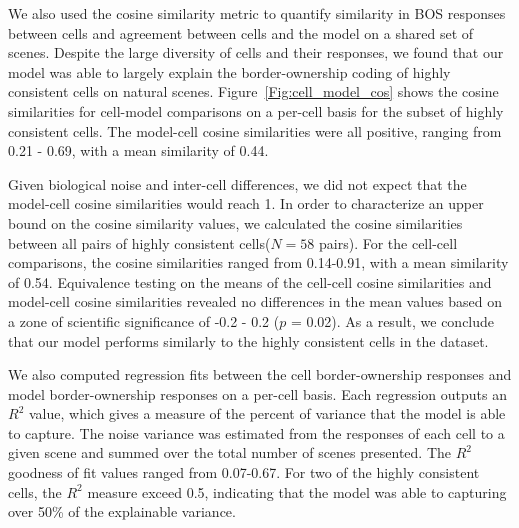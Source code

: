 We also used the cosine similarity metric to quantify similarity in BOS responses between cells and agreement between cells and the model on a shared set of scenes. Despite the large diversity of cells and their responses, we found that our model was able to largely explain the border-ownership coding of highly consistent cells on natural scenes. Figure~\ref{Fig:cell_model_cos} shows the cosine similarities for cell-model comparisons on a per-cell basis for the subset of highly consistent cells. The model-cell cosine similarities were all positive, ranging from 0.21 - 0.69, with a mean similarity of 0.44.

Given biological noise and inter-cell differences, we did not expect that the model-cell cosine similarities would reach 1. In order to characterize an upper bound on the cosine similarity values, we calculated the cosine similarities between all pairs of highly consistent cells($N = 58$ pairs). For the cell-cell comparisons, the cosine similarities ranged from 0.14-0.91, with a mean similarity of 0.54. Equivalence testing on the means of the cell-cell cosine similarities and model-cell cosine similarities revealed no differences in the mean values based on a zone of scientific significance of -0.2 - 0.2 ($p$ = 0.02). As a result, we conclude that our model performs similarly to the highly consistent cells in the dataset.

We also computed regression fits between the cell border-ownership responses and model border-ownership responses on a per-cell basis. Each regression outputs an $R^2$ value, which gives a measure of the percent of variance that the model is able to capture. The noise variance was estimated from the responses of each cell to a given scene and summed over the total number of scenes presented. The $R^2$ goodness of fit values ranged from 0.07-0.67. For two of the highly consistent cells, the $R^2$ measure exceed 0.5, indicating that the model was able to capturing over 50\% of the explainable variance.

